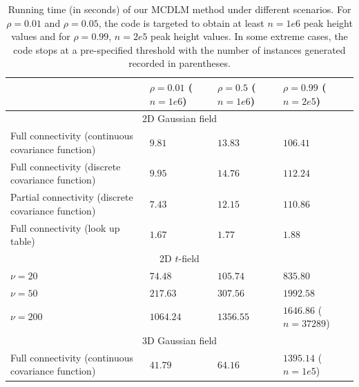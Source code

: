 \documentclass{article}
\begin{document}
\begin{table}[!htp]
\small
\begin{center}
\caption{Running time (in seconds) of our MCDLM method under different scenarios. For $\rho = 0.01$ and $\rho = 0.05$, the code is targeted to obtain at least $n = 1e6$ peak height values and for $\rho = 0.99$, $n = 2e5$ peak height values. In some extreme cases, the code stops at a pre-specified threshold with the number of instances generated recorded in parentheses.\label{tab1}}
\begin{tabular}{|l|l|l|l|}
\hline & $\rho = 0.01$ ($n = 1e6$) & $\rho = 0.5$ ($n = 1e6$) & $\rho = 0.99$ ($n = 2e5$) \\ \hline
\multicolumn{4}{|c|}{2D Gaussian field}                                                                                          \\ \hline
Full connectivity (continuous covariance function)  & $9.81$                    & $13.83$                  & $106.41$                  \\ \hline
Full connectivity (discrete covariance function)    & $9.95$                    & $14.76$                  & $112.24$                  \\ \hline
Partial connectivity (discrete covariance function) & $7.43$                    & $12.15$                  & $110.86$                  \\ \hline
Full connectivity (look up table)                   & $1.67$                    & $1.77$                   & $1.88$                    \\ \hline
\multicolumn{4}{|c|}{2D $t$-field}                                                                                                 \\ \hline
$\nu = 20$                                          & $74.48$                   & $105.74$                 & $835.80$                  \\ \hline
$\nu = 50$                                          & $217.63$                  & $307.56$                 & $1992.58$                 \\ \hline
$\nu = 200$                                         & $1064.24$                 & $1356.55$                & $1646.86$ ($n = 37289$)     \\ \hline
\multicolumn{4}{|c|}{3D Gaussian field}                                                                                          \\ \hline
Full connectivity (continuous covariance function)  & $41.79$                   & $64.16$                  & $1395.14$ ($n = 1e5$)       \\ \hline

\end{tabular}
\end{center}
\end{table}
\end{document}
